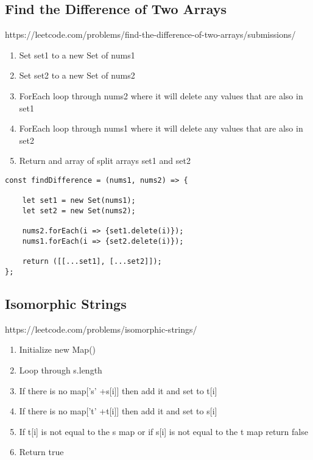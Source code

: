 \documentclass[10pt]{article}
\begin{document}
\medskip %











\pagebreak %
\medskip   
\subsection{Find the Difference of Two Arrays}
https://leetcode.com/problems/find-the-difference-of-two-arrays/submissions/

\begin{enumerate}
	\item Set set1 to a new Set of nums1
	\item Set set2 to a new Set of nums2
	\item ForEach loop through nums2 where it will delete any values that are also in set1
	\item ForEach loop through nums1 where it will delete any values that are also in set2
	\item Return and array of split arrays set1 and set2
\end{enumerate}

\begin{lstlisting}[title=Solution findDifference, captionpos=t]
const findDifference = (nums1, nums2) => {
    
    let set1 = new Set(nums1);
    let set2 = new Set(nums2);

    nums2.forEach(i => {set1.delete(i)});
    nums1.forEach(i => {set2.delete(i)});

    return ([[...set1], [...set2]]);
};
\end{lstlisting}

\medskip %








\pagebreak %
\medskip   
\subsection{Isomorphic Strings}
https://leetcode.com/problems/isomorphic-strings/

\begin{enumerate}
	\item Initialize new Map()
	\item Loop through s.length 
	\item If there is no map['s' +s[i]] then add it and set to t[i]
	\item If there is no map['t' +t[i]] then add it and set to s[i]
	\item If t[i] is not equal to the s map or if s[i] is not equal to the t map return false 
	\item Return true
\end{enumerate}
\end{document}
